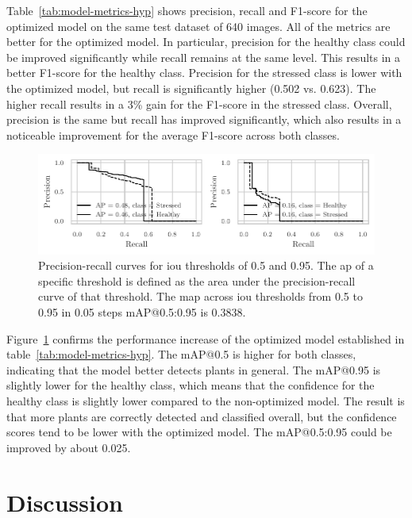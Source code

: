 \documentclass[draft,final]{vutinfth} %
\begin{document}
Table~\ref{tab:model-metrics-hyp} shows precision, recall and F1-score
for the optimized model on the same test dataset of 640 images. All of
the metrics are better for the optimized model. In particular,
precision for the healthy class could be improved significantly while
recall remains at the same level. This results in a better F1-score
for the healthy class. Precision for the stressed class is lower with
the optimized model, but recall is significantly higher (0.502
vs. 0.623). The higher recall results in a 3\% gain for the F1-score
in the stressed class. Overall, precision is the same but recall has
improved significantly, which also results in a noticeable improvement
for the average F1-score across both classes.

\begin{figure}
  \centering
  \includegraphics{graphics/APModel-model-original-relabeled.pdf}
  \caption[Optimized aggregate model AP@0.5 and
  AP@0.95.]{Precision-recall curves for \gls{iou} thresholds of 0.5
    and 0.95. The \gls{ap} of a specific threshold is defined as the
    area under the precision-recall curve of that threshold. The
    \gls{map} across \gls{iou} thresholds from 0.5 to 0.95 in 0.05
    steps \textsf{mAP}@0.5:0.95 is 0.3838.}
  \label{fig:aggregate-ap-hyp}
\end{figure}

Figure~\ref{fig:aggregate-ap-hyp} confirms the performance increase of
the optimized model established in
table~\ref{tab:model-metrics-hyp}. The \textsf{mAP}@0.5 is higher for
both classes, indicating that the model better detects plants in
general. The \textsf{mAP}@0.95 is slightly lower for the healthy
class, which means that the confidence for the healthy class is
slightly lower compared to the non-optimized model. The result is that
more plants are correctly detected and classified overall, but the
confidence scores tend to be lower with the optimized model. The
\textsf{mAP}@0.5:0.95 could be improved by about 0.025.

\section{Discussion}
\label{sec:discussion}
\end{document}
